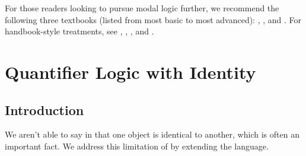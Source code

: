 For those readers looking to pursue modal logic further, we recommend the following three textbooks (listed from most basic to most advanced): \citep{Beall2003}, \citep{Hughes1996}, and \citep{Cocchiarella2008modal}. 
For handbook-style treatments, see \citep{Cresswell2001}, \citep{Bull2001}, \citep{Zakharyaschev2001}, and \citep{Garson2001}.

\section{Quantifier Logic with Identity}\label{Sec:Quantifier Logic with Identity}

\subsection{Introduction}
We aren't able to say in \GQL{} that one object is identical to another, which is often an important fact. We address this limitation of \GSL{} by extending the language. 

